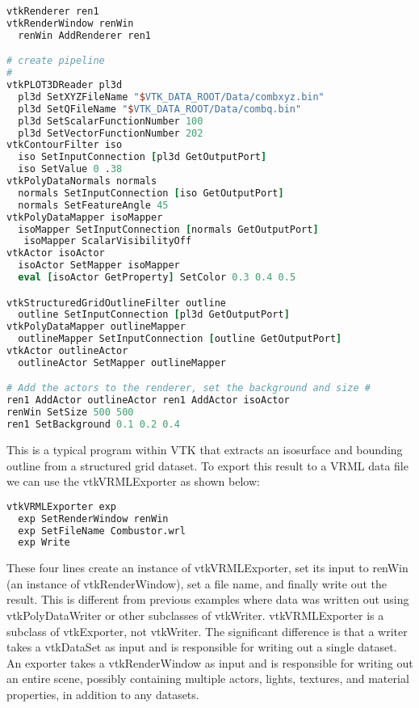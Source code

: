 \begin{lstlisting}[language=TCL, caption={}, numbers=none, frame=none]
vtkRenderer ren1
vtkRenderWindow renWin
  renWin AddRenderer ren1

# create pipeline
#
vtkPLOT3DReader pl3d
  pl3d SetXYZFileName "$VTK_DATA_ROOT/Data/combxyz.bin"
  pl3d SetQFileName "$VTK_DATA_ROOT/Data/combq.bin"
  pl3d SetScalarFunctionNumber 100
  pl3d SetVectorFunctionNumber 202
vtkContourFilter iso
  iso SetInputConnection [pl3d GetOutputPort]
  iso SetValue 0 .38
vtkPolyDataNormals normals
  normals SetInputConnection [iso GetOutputPort]
  normals SetFeatureAngle 45
vtkPolyDataMapper isoMapper
  isoMapper SetInputConnection [normals GetOutputPort]
   isoMapper ScalarVisibilityOff
vtkActor isoActor
  isoActor SetMapper isoMapper
  eval [isoActor GetProperty] SetColor 0.3 0.4 0.5

vtkStructuredGridOutlineFilter outline
  outline SetInputConnection [pl3d GetOutputPort]
vtkPolyDataMapper outlineMapper
  outlineMapper SetInputConnection [outline GetOutputPort]
vtkActor outlineActor
  outlineActor SetMapper outlineMapper

# Add the actors to the renderer, set the background and size #
ren1 AddActor outlineActor ren1 AddActor isoActor
renWin SetSize 500 500
ren1 SetBackground 0.1 0.2 0.4
\end{lstlisting}

This is a typical program within VTK that extracts an isosurface and bounding outline from a structured grid dataset. To export this result to a VRML data file we can use the vtkVRMLExporter as shown below:

\begin{lstlisting}[language=TCL, caption={}, numbers=none, frame=none]
vtkVRMLExporter exp
  exp SetRenderWindow renWin
  exp SetFileName Combustor.wrl
  exp Write
\end{lstlisting}

These four lines create an instance of vtkVRMLExporter, set its input to renWin (an instance of vtkRenderWindow), set a file name, and finally write out the result. This is different from previous examples where data was written out using vtkPolyDataWriter or other subclasses of vtkWriter. vtkVRMLExporter is a subclass of vtkExporter, not vtkWriter. The significant difference is that a writer takes a vtkDataSet as input and is responsible for writing out a single dataset. An exporter takes a vtkRenderWindow as input and is responsible for writing out an entire scene, possibly containing multiple actors, lights, textures, and material properties, in addition to any datasets.

